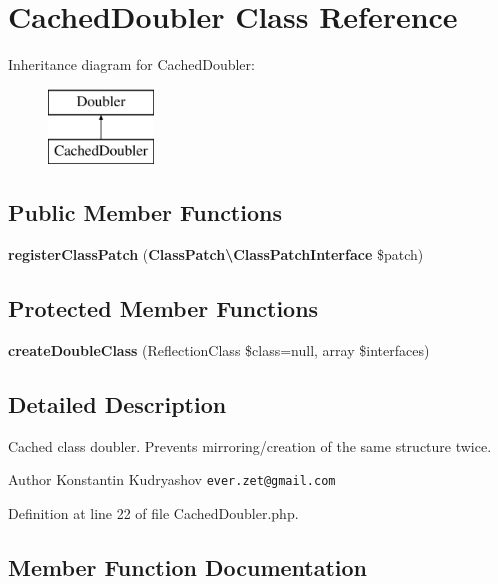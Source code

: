 \section{Cached\+Doubler Class Reference}
\label{class_prophecy_1_1_doubler_1_1_cached_doubler}
Inheritance diagram for Cached\+Doubler\+:\begin{figure}[H]
\begin{center}
\leavevmode
\includegraphics[height=2.000000cm]{class_prophecy_1_1_doubler_1_1_cached_doubler}
\end{center}
\end{figure}
\subsection*{Public Member Functions}
\begin{DoxyCompactItemize}
\item 
{\bf register\+Class\+Patch} ({\bf Class\+Patch\textbackslash{}\+Class\+Patch\+Interface} \$patch)
\end{DoxyCompactItemize}
\subsection*{Protected Member Functions}
\begin{DoxyCompactItemize}
\item 
{\bf create\+Double\+Class} (Reflection\+Class \$class=null, array \$interfaces)
\end{DoxyCompactItemize}


\subsection{Detailed Description}
Cached class doubler. Prevents mirroring/creation of the same structure twice.

\begin{DoxyAuthor}{Author}
Konstantin Kudryashov {\tt ever.\+zet@gmail.\+com} 
\end{DoxyAuthor}


Definition at line 22 of file Cached\+Doubler.\+php.



\subsection{Member Function Documentation}
